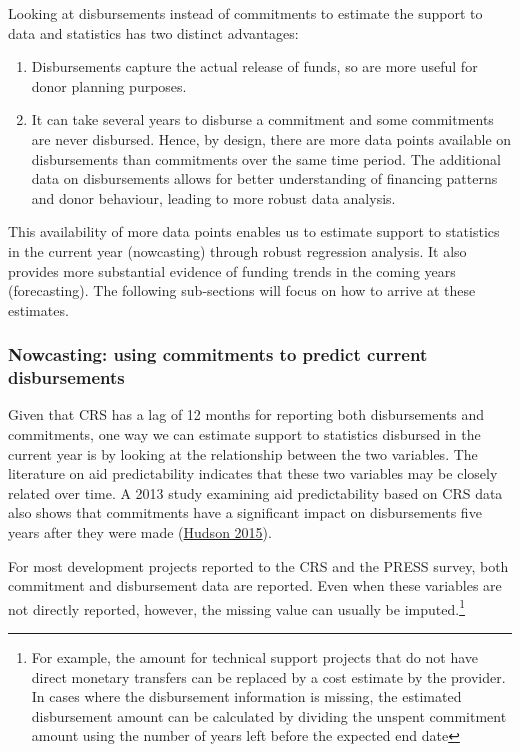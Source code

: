 \documentclass[
]{article}
\begin{document}
Looking at disbursements instead of commitments to estimate the support to data and statistics has
two distinct advantages:

\begin{enumerate}
\def\labelenumi{\arabic{enumi}.}
\item
  Disbursements capture the actual release of funds, so are more useful for donor planning purposes.
\item
  It can take several years to disburse a commitment and some commitments are never
  disbursed. Hence, by design, there are more data points available on disbursements than
  commitments over the same time period. The additional data on disbursements allows for
  better understanding of financing patterns and donor behaviour, leading to more robust data analysis.
\end{enumerate}

This availability of more data points enables us to estimate support to statistics in the current year
(nowcasting) through robust regression analysis. It also provides more substantial evidence of funding
trends in the coming years (forecasting). The following sub‐sections will focus on how to arrive at
these estimates.

\hypertarget{nowcasting-using-commitments-to-predict-current-disbursements}{%
\subsubsection{Nowcasting: using commitments to predict current disbursements}\label{nowcasting-using-commitments-to-predict-current-disbursements}}

Given that CRS has a lag of 12 months for reporting both disbursements and commitments, one way
we can estimate support to statistics disbursed in the current year is by looking at the relationship
between the two variables. The literature on aid predictability indicates that these two variables may
be closely related over time. A 2013 study examining aid predictability based on CRS data also shows
that commitments have a significant impact on disbursements five years after they were made
(\protect\hyperlink{ref-Hudson}{Hudson 2015}).

For most development projects reported to the CRS and the PRESS survey, both commitment and
disbursement data are reported. Even when these variables are not directly reported, however, the
missing value can usually be imputed.\footnote{For example, the amount for technical support projects that do not have direct monetary transfers can be
  replaced by a cost estimate by the provider. In cases where the disbursement information is missing, the
  estimated disbursement amount can be calculated by dividing the unspent commitment amount using the
  number of years left before the expected end date}
\end{document}
